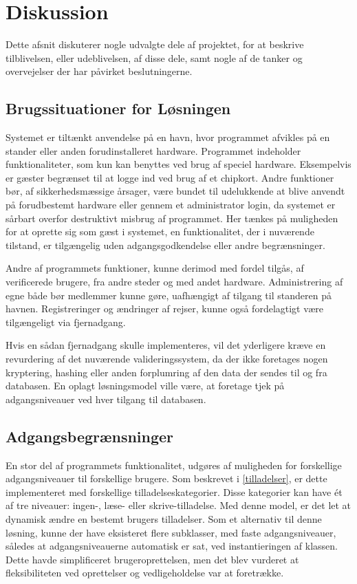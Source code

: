 \chapter{Diskussion}
\label{cha:diskussion}

Dette afsnit diskuterer nogle udvalgte dele af projektet, for at beskrive tilblivelsen, eller udeblivelsen, af disse dele, samt nogle af de tanker og overvejelser der har påvirket beslutningerne.

\section{Brugssituationer for Løsningen} 

Systemet er tiltænkt anvendelse på en havn, hvor programmet afvikles på en stander eller anden forudinstalleret hardware. Programmet indeholder funktionaliteter, som kun kan benyttes ved brug af speciel hardware. Eksempelvis er gæster begrænset til at logge ind ved brug af et chipkort. Andre funktioner bør, af sikkerhedsmæssige årsager, være bundet til udelukkende at blive anvendt på forudbestemt hardware eller gennem et administrator login, da systemet er sårbart overfor destruktivt misbrug af programmet. Her tænkes på muligheden for at oprette sig som gæst i systemet, en funktionalitet, der i nuværende tilstand, er tilgængelig uden adgangsgodkendelse eller andre begrænsninger.

Andre af programmets funktioner, kunne derimod med fordel tilgås, af verificerede brugere, fra andre steder og med andet hardware. Administrering af egne både bør medlemmer kunne gøre, uafhængigt af tilgang til standeren på havnen. Registreringer og ændringer af rejser, kunne også fordelagtigt være tilgængeligt via fjernadgang.

Hvis en sådan fjernadgang skulle implementeres, vil det yderligere kræve en revurdering af det nuværende valideringssystem, da der ikke foretages nogen kryptering, hashing eller anden forplumring af den data der sendes til og fra databasen. En oplagt løsningsmodel ville være, at foretage tjek på adgangsniveauer ved hver tilgang til databasen.

\section{Adgangsbegrænsninger}

En stor del af programmets funktionalitet, udgøres af muligheden for forskellige adgangsniveauer til forskellige brugere. Som beskrevet i \cref{tilladelser}, er dette implementeret med forskellige tilladelseskategorier. Disse kategorier kan have ét af tre niveauer: ingen-, læse- eller skrive-tilladelse. Med denne model, er det let at dynamisk ændre en bestemt brugers tilladelser. Som et alternativ til denne løsning, kunne der have eksisteret flere subklasser, med faste adgangsniveauer, således at adgangsniveauerne automatisk er sat, ved instantieringen af klassen. Dette havde simplificeret brugeroprettelsen, men det blev vurderet at fleksibiliteten ved oprettelser og vedligeholdelse var at foretrække.

